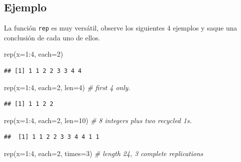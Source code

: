 \documentclass[
]{book}
\makeatletter
\newenvironment{Shaded}{\begin{snugshade}}{\end{snugshade}}
\newcommand{\AttributeTok}[1]{\textcolor[rgb]{0.77,0.63,0.00}{#1}}
\newcommand{\CommentTok}[1]{\textcolor[rgb]{0.56,0.35,0.01}{\textit{#1}}}
\newcommand{\DecValTok}[1]{\textcolor[rgb]{0.00,0.00,0.81}{#1}}
\newcommand{\FunctionTok}[1]{\textcolor[rgb]{0.00,0.00,0.00}{#1}}
\newcommand{\NormalTok}[1]{#1}
\newcommand{\SpecialCharTok}[1]{\textcolor[rgb]{0.00,0.00,0.00}{#1}}
\newenvironment{kframe}{%
\medskip{}
\setlength{\fboxsep}{.8em}
 \def\at@end@of@kframe{}%
 \ifinner\ifhmode%
  \def\at@end@of@kframe{\end{minipage}}%
  \begin{minipage}{\columnwidth}%
 \fi\fi%
 \def\FrameCommand##1{\hskip\@totalleftmargin \hskip-\fboxsep
 \colorbox{shadecolor}{##1}\hskip-\fboxsep
     \hskip-\linewidth \hskip-\@totalleftmargin \hskip\columnwidth}%
 \MakeFramed {\advance\hsize-\width
   \@totalleftmargin\z@ \linewidth\hsize
   \@setminipage}}%
 {\par\unskip\endMakeFramed%
 \at@end@of@kframe}
\renewenvironment{Shaded}{\begin{kframe}}{\end{kframe}}
\makeatother
\begin{document}
\hypertarget{ejemplo-12}{%
\subsection*{Ejemplo}\label{ejemplo-12}}

La función \texttt{rep} es muy versátil, observe los siguientes 4 ejemplos y saque una conclusión de cada uno de ellos.

\begin{Shaded}
\begin{Highlighting}[]
\FunctionTok{rep}\NormalTok{(}\AttributeTok{x=}\DecValTok{1}\SpecialCharTok{:}\DecValTok{4}\NormalTok{, }\AttributeTok{each=}\DecValTok{2}\NormalTok{)}
\end{Highlighting}
\end{Shaded}

\begin{verbatim}
## [1] 1 1 2 2 3 3 4 4
\end{verbatim}

\begin{Shaded}
\begin{Highlighting}[]
\FunctionTok{rep}\NormalTok{(}\AttributeTok{x=}\DecValTok{1}\SpecialCharTok{:}\DecValTok{4}\NormalTok{, }\AttributeTok{each=}\DecValTok{2}\NormalTok{, }\AttributeTok{len=}\DecValTok{4}\NormalTok{)    }\CommentTok{\# first 4 only.}
\end{Highlighting}
\end{Shaded}

\begin{verbatim}
## [1] 1 1 2 2
\end{verbatim}

\begin{Shaded}
\begin{Highlighting}[]
\FunctionTok{rep}\NormalTok{(}\AttributeTok{x=}\DecValTok{1}\SpecialCharTok{:}\DecValTok{4}\NormalTok{, }\AttributeTok{each=}\DecValTok{2}\NormalTok{, }\AttributeTok{len=}\DecValTok{10}\NormalTok{)   }\CommentTok{\# 8 integers plus two recycled 1\textquotesingle{}s.}
\end{Highlighting}
\end{Shaded}

\begin{verbatim}
##  [1] 1 1 2 2 3 3 4 4 1 1
\end{verbatim}

\begin{Shaded}
\begin{Highlighting}[]
\FunctionTok{rep}\NormalTok{(}\AttributeTok{x=}\DecValTok{1}\SpecialCharTok{:}\DecValTok{4}\NormalTok{, }\AttributeTok{each=}\DecValTok{2}\NormalTok{, }\AttributeTok{times=}\DecValTok{3}\NormalTok{)  }\CommentTok{\# length 24, 3 complete replications}
\end{Highlighting}
\end{Shaded}
\end{document}
